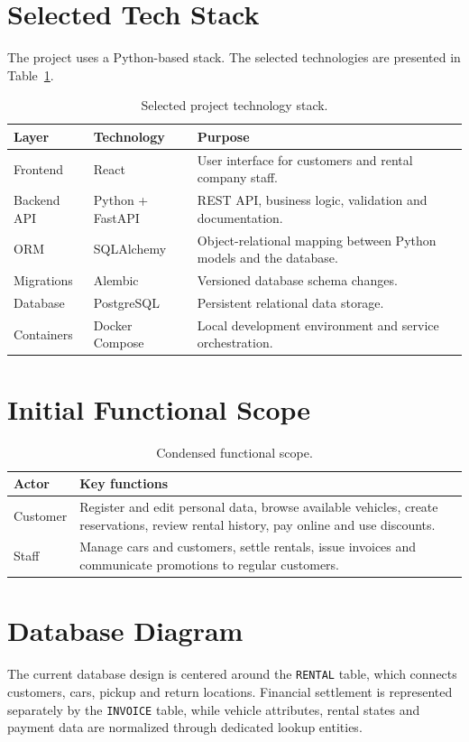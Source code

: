\documentclass[11pt,a4paper]{article}
\begin{document}
\section{Selected Tech Stack}
The project uses a Python-based stack. The selected technologies are presented in Table~\ref{tab:stack}.

\begin{table}[h!]
\centering
\small
\begin{tabularx}{\textwidth}{@{}p{2.7cm}p{4.2cm}X@{}}
\toprule
\textbf{Layer} & \textbf{Technology} & \textbf{Purpose} \\
\midrule
Frontend & React & User interface for customers and rental company staff. \\
Backend API & Python + FastAPI & REST API, business logic, validation and documentation. \\
ORM & SQLAlchemy & Object-relational mapping between Python models and the database. \\
Migrations & Alembic & Versioned database schema changes. \\
Database & PostgreSQL & Persistent relational data storage. \\
Containers & Docker Compose & Local development environment and service orchestration. \\
\bottomrule
\end{tabularx}
\caption{Selected project technology stack.}
\label{tab:stack}
\end{table}

\section{Initial Functional Scope}
\begin{table}[h!]
\centering
\small
\begin{tabularx}{\textwidth}{@{}p{2.8cm}X@{}}
\toprule
\textbf{Actor} & \textbf{Key functions} \\
\midrule
Customer & Register and edit personal data, browse available vehicles, create reservations, review rental history, pay online and use discounts. \\
Staff & Manage cars and customers, settle rentals, issue invoices and communicate promotions to regular customers. \\
\bottomrule
\end{tabularx}
\caption{Condensed functional scope.}
\end{table}

\section{Database Diagram}
The current database design is centered around the \texttt{RENTAL} table, which connects customers, cars, pickup and return locations. Financial settlement is represented separately by the \texttt{INVOICE} table, while vehicle attributes, rental states and payment data are normalized through dedicated lookup entities.
\end{document}
